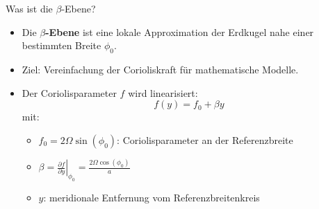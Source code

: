 
\begin{frame}{Was ist die \(\beta\)-Ebene?}
	\begin{itemize}
		\item Die \textbf{\(\beta\)-Ebene} ist eine lokale Approximation der Erdkugel nahe einer bestimmten Breite \(\phi_0\).
		\item Ziel: Vereinfachung der Corioliskraft für mathematische Modelle.
		\item Der Coriolisparameter \(f\) wird linearisiert:
		      \[
			      f(y) = f_0 + \beta y
		      \]
		      mit:
		      \begin{itemize}
			      \item \(f_0 = 2\Omega \sin(\phi_0)\): Coriolisparameter an der Referenzbreite
			      \item \(\beta = \left.\frac{\partial f}{\partial y}\right|_{\phi_0} = \frac{2\Omega \cos(\phi_0)}{a}\)
			      \item \(y\): meridionale Entfernung vom Referenzbreitenkreis
		      \end{itemize}
	\end{itemize}
\end{frame}


